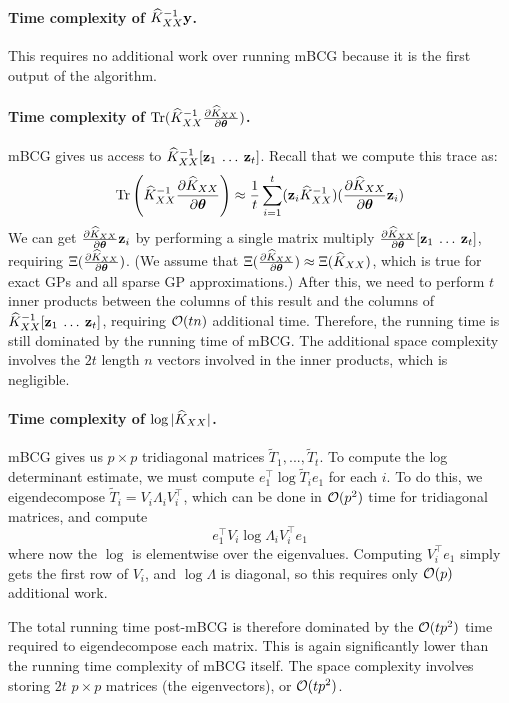 \paragraph{Time complexity of $\widehat{K}_{XX}^{-1}\mathbf{y}$.}
This requires no additional work over running mBCG because it is the first output of the algorithm.

\paragraph{Time complexity of $\tr{\trainK^{-1}\frac{\partial \trainK}{\partial \btheta}}$.}
mBCG gives us access to $\widehat{K}_{XX}^{-1}[\mathbf{z}_{1} \: \ldots \: \mathbf{z}_{t}]$.
Recall that we compute this trace as:
\begin{equation}
  \tr{\trainK^{-1}\frac{\partial \trainK}{\partial \btheta}} \approx \frac{1}{t}\sum_{i=1}^{t}(\bz_{i}\trainK^{-1})(\frac{\partial \trainK}{\partial \btheta}\bz_{i})
\end{equation}
We can get $\frac{\partial \widehat{K}_{XX}}{\partial \boldsymbol{\theta}}\mathbf{z}_{i}$ by performing a single matrix multiply $\frac{\partial \widehat{K}_{XX}}{\partial \boldsymbol{\theta}}[\mathbf{z}_{1} \: \ldots \: \mathbf{z}_{t}]$, requiring $\Xi (\frac{\partial \widehat{K}_{XX}}{\partial \boldsymbol{\theta}})$.
(We assume that $\Xi (\frac{\partial \widehat{K}_{XX}}{\partial \boldsymbol{\theta}}) \approx \Xi (\widehat{K}_{XX})$, which is true for exact GPs and all sparse GP approximations.)
After this, we need to perform $t$ inner products between the columns of this result and the columns of $\widehat{K}_{XX}^{-1}[\mathbf{z}_{1} \: \ldots \: \mathbf{z}_{t}]$, requiring $\bigo{tn}$ additional time.
Therefore, the running time is still dominated by the running time of mBCG.
The additional space complexity involves the $2t$ length $n$ vectors involved in the inner products, which is negligible.

\paragraph{Time complexity of $\log \vert \widehat{K}_{XX} \vert$.}
mBCG gives us $p \times p$ tridiagonal matrices  $\tilde{T}_{1},...,\tilde{T}_{t}$. To compute the log determinant estimate, we must compute $e_{1}^{\top}\log \tilde{T}_{i} e_{1}$ for each $i$. To do this, we eigendecompose $\tilde{T}_{i}=V_{i}\Lambda_{i}V_{i}^{\top}$, which can be done in $\bigo{p^{2}}$ time for tridiagonal matrices, and compute
\begin{equation}
  e_1^\top V_i\log \Lambda_i V_i^\top e_1
\end{equation}
where now the $\log$ is elementwise over the eigenvalues. Computing $V_i^\top e_1$ simply gets the first row of $V_i$, and $\log \Lambda$ is diagonal, so this requires only $\bigo{p}$ additional work.

The total running time post-mBCG is therefore dominated by the $\bigo{tp^{2}}$ time required to eigendecompose each matrix. This is again significantly lower than the running time complexity of mBCG itself. The space complexity involves storing $2t$ $p \times p$ matrices (the eigenvectors), or $\bigo{tp^{2}}$.
